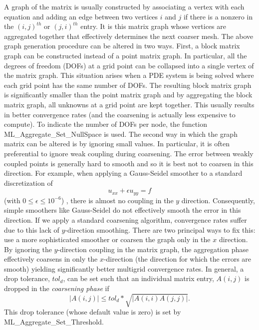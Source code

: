 \documentclass{article}[11pt]
\begin{document}
A graph of the matrix is usually constructed by associating a vertex
with each equation and adding an edge between two vertices $i$ and $j$
if there is a nonzero in the $(i,j)^{th}$ or $(j,i)^{th}$ entry. It is
this matrix graph whose vertices are aggregated together that effectively
determines the next coarser mesh. The above graph generation procedure
can be altered in two ways. First, a block matrix graph can be constructed
instead of a point matrix graph. In particular, all the degrees of freedom (DOFs) 
at a grid point
can be collapsed into a single vertex of the matrix graph. This situation
arises when a PDE system is being solved where each grid point has the same 
number of DOFs. The resulting block matrix graph is significantly smaller 
than the point matrix graph and by aggregating the block matrix graph, 
all unknowns at a grid point are kept together.  This usually results in
better convergence rates (and the coarsening is actually less expensive to 
compute).  To indicate the number of DOFs per node,
the function {\sf ML\_Aggregate\_Set\_NullSpace} is used.
The second way in which the graph matrix can be altered is by 
ignoring small values. In particular,
it is often preferential to ignore weak coupling during coarsening.
The error between weakly coupled points is generally hard to smooth
and so it is best not to coarsen in this direction.
For example,
when applying a Gauss-Seidel smoother to a standard discretization of 
$$
u_{xx} + \epsilon u_{yy} = f  
$$
(with $ 0 \le \epsilon \le 10^{-6}$) ,
there is almost no coupling in the $y$ direction. Consequently, simple smoothers
like Gauss-Seidel do not effectively smooth the error in this direction. If we apply a standard
coarsening algorithm, convergence rates suffer due to this lack of $y$-direction
smoothing. There are two principal ways to fix this: use a more sophisticated smoother
or coarsen the graph only in the $x$ direction.
By ignoring the $y$-direction coupling in the matrix graph, the aggregation phase 
effectively coarsens in only the $x$-direction (the direction
for which the errors are smooth)
yielding significantly better multigrid convergence rates. In general,
a drop tolerance,
$tol_{d}$,
can be set such that an individual matrix entry, $ A(i,j)$ is dropped
in the {\it coarsening phase}
if 
$$
 | A(i,j) | \le tol_d * \sqrt{ | A(i,i) A(j,j) | } .
 $$
 This drop tolerance (whose default value is zero) is set by {\sf
   ML\_Aggregate\_Set\_Threshold}.
\end{document}
